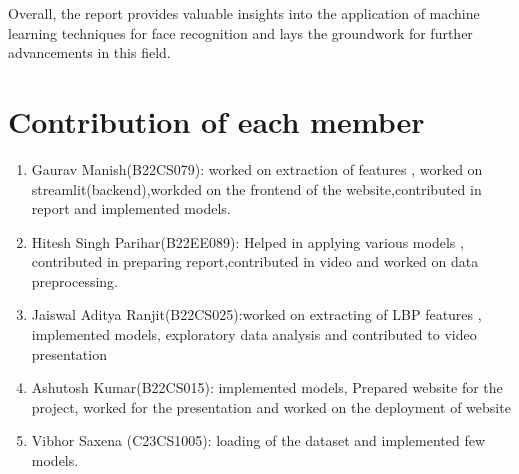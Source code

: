 \documentclass[a4paper]{article}
\theoremstyle{plain}
\theoremstyle{definition}
\begin{document}
Overall, the report provides valuable insights into the application of machine learning techniques for face recognition and lays the groundwork for further advancements in this field.\vspace{8pt}
	

	
	
	
	\appendix
	
	\section{Contribution of each member}
	\label{sec:contribution}
	\begin{enumerate}
	\item Gaurav Manish(B22CS079): worked on extraction of features , worked on streamlit(backend),workded on the frontend of the website,contributed in report and implemented models.
	\item Hitesh Singh Parihar(B22EE089): Helped in applying various models , contributed in preparing report,contributed in video and worked on data preprocessing.
 \item Jaiswal Aditya Ranjit(B22CS025):worked on extracting of LBP features , implemented models, exploratory data analysis and contributed to video  presentation 
  \item Ashutosh Kumar(B22CS015): implemented models, Prepared website for the project, worked for the presentation and worked on the deployment of website
  \item Vibhor Saxena (C23CS1005): loading of the dataset and implemented few models.
	
	\end{enumerate}
    	
	
\end{document}
